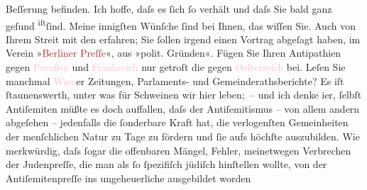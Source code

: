                     Beſſerung befinden. Ich hoffe, daſs es ſich ſo verhält und daſs Sie bald ganz
                    geſund \substVorne{}\textsuperscript{iſt}\substDazwischen{}ſind\substHinten{}. Meine innigſten Wünſche ſind bei Ihnen, {\pb}das wiſſen Sie. Auch von Ihrem Streit mit
                    den \label{K_L00880_2v}\label{K_L00880_2h} erfahren; Sie ſollen irgend einen Vortrag abgeſagt
                    haben, im Verein »\textcolor{brown}{Berliner Preſſe}{}\ledrightnote{\textcolor{brown}{Verein Berliner Presse}}«, aus »polit.
                    Gründen«. Fügen Sie Ihren Antipathien gegen \textcolor{pink}{Preußen}{}\ledrightnote{\textcolor{pink}{Preußen}} und \textcolor{pink}{Frankreich}{}\ledrightnote{\textcolor{pink}{Frankreich}} nur getroſt \introOben{}die\introOben{} gegen \textcolor{pink}{Oeſterreich}{}\ledrightnote{\textcolor{pink}{Österreich}} bei. Leſen Sie manchmal \textcolor{pink}{Wien}{}\ledrightnote{\textcolor{pink}{Wien}}er Zeitungen, Parlaments- und
                    Gemeinderathsberichte? Es iſt ſtaunenswerth, unter was für Schweinen wir hier
                    leben; – und {\pb}ich denke i{\geminationm}er, ſelbſt Antiſemiten müßte es doch auffallen,
                    daſs der Antiſemitismus – von allem andern abgeſehen – jedenfalls die ſonderbare
                    Kraft hat, die verlogenſten Gemeinheiten der menſchlichen Natur zu Tage zu
                    fördern und ſie aufs höchſte auszubilden. Wie merkwürdig, daſs ſogar die
                    offenbaren Mängel, Fehler, meinetwegen Verbrechen der Judenpreſſe, die man als
                    ſo ſpezifiſch jüdiſch hinſtellen wollte, von der Antiſemiten{\pb}preſſe ins ungeheuerliche ausgebildet worden
